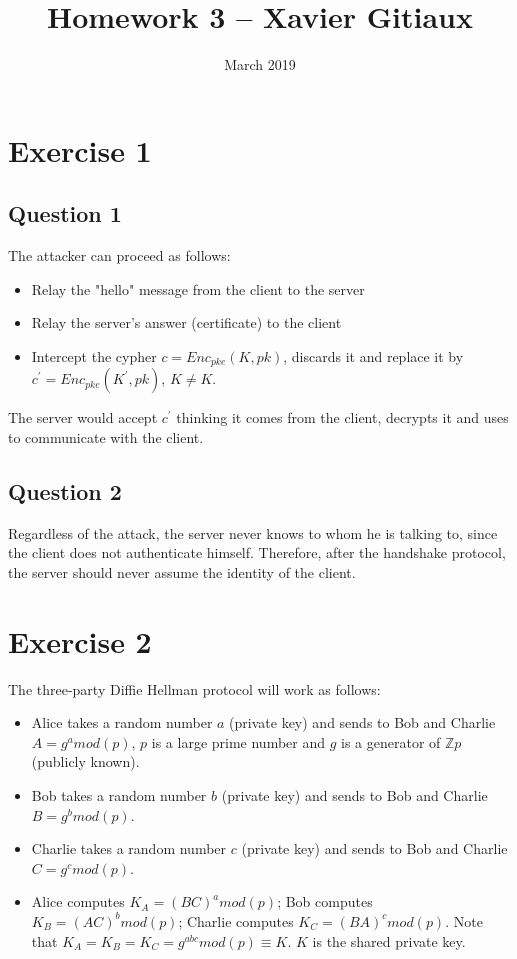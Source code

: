 \documentclass{article}
\title{Homework 3 -- Xavier Gitiaux}
\author{}
\date{March 2019}
\begin{document}
\maketitle

\section{Exercise 1}
\subsection{Question 1}
 The attacker can proceed as follows:
 \begin{itemize}
 	\item Relay the "hello" message from the client to the server
 	\item Relay the server's answer (certificate) to the client
 	\item Intercept the cypher $c=Enc_{pke}(K, pk)$, discards it and replace it by $c^{'}=Enc_{pke}(K^{'}, pk)$, $K\neq K$.
 \end{itemize}
The server would accept $c^{'}$ thinking it comes from the client, decrypts it and uses to communicate with the client.

\subsection{Question 2}
Regardless of the attack, the server never knows to whom he is talking to, since the client does not authenticate himself. Therefore, after the handshake protocol, the server should never assume the identity of the client. 




\section{Exercise 2}
The three-party Diffie Hellman protocol will work as follows:
\begin{itemize}
	\item Alice takes a random number $a$ (private key) and sends to Bob and Charlie $A =g^{a} mod(p)$,  $p$ is a large prime number and $g$ is a generator of $\mathbb{Z}p$ (publicly known).
	\item Bob takes a random number $b$ (private key) and sends to Bob and Charlie $B =g^{b} mod(p)$.
	\item Charlie takes a random number $c$ (private key) and sends to Bob and Charlie $C =g^{c} mod(p)$.
	\item Alice computes $K_{A}= (BC)^{a}mod(p)$; Bob computes $K_{B}= (AC)^{b}mod(p)$; Charlie computes $K_{C}= (BA)^{c}mod(p)$. Note that $K_{A}=K_{B}=K_{C}=g^{abc}mod(p)\equiv K$. $K$ is the shared private key. 
\end{itemize}
\end{document}
